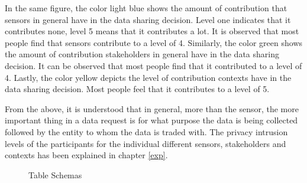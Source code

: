 In the same figure, the color light blue shows the amount of contribution that sensors in general have in the data sharing decision. Level one indicates that it contributes none, level 5 means that it contributes a lot. It is observed that most people find that sensors contribute to a level of 4. Similarly, the color green shows the amount of contribution stakeholders in general have in the data sharing decision. It can be observed that most people find that it contributed to a level of 4. Lastly, the color yellow depicts the level of contribution contexts have in the data sharing decision. Most people feel that it contributes to a level of 5.

From the above, it is understood that in general, more than the sensor, the more important thing in a data request is for what purpose the data is being collected followed by the entity to whom the data is traded with. The privacy intrusion levels of the participants for the individual different sensors, stakeholders and contexts has been explained in chapter \ref{exp}.

%

\begin{figure}[htp]
\hspace{1em}
\caption{Table Schemas}
\label{fig:s3}
\end{figure}

